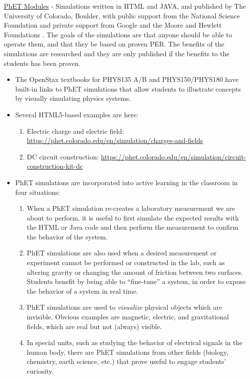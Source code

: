 \documentclass[../../../main.tex]{subfiles}
\begin{document}
\underline{PhET Modules} - Simulations written in HTML and JAVA, and published by The University of Colorado, Boulder, with public support from the National Science Foundation and private support from Google and the Moore and Hewlett Foundations \cite{phet}.  The goals of the simulations are that anyone should be able to operate them, and that they be based on proven PER.  The benefits of the simulations are researched and they are only published if the benefits to the students has been proven.
\begin{itemize}
\item The OpenStax textbooks for PHYS135 A/B and PHYS150/PHYS180 have built-in links to PhET simulations that allow students to illustrate concepts by visually simulating physics systems.
\item Several HTML5-based examples are here:
\begin{enumerate}
\item Electric charge and electric field: \url{https://phet.colorado.edu/en/simulation/charges-and-fields}
\item DC circuit construction: \url{https://phet.colorado.edu/en/simulation/circuit-construction-kit-dc}
\end{enumerate}
\item PhET simulations are incorporated into active learning in the classroom in four situations:
\begin{enumerate}
\item When a PhET simulation re-creates a laboratory measurement we are about to perform, it is useful to first simulate the expected results with the HTML or Java code and then perform the measurement to confirm the behavior of the system.
\item PhET simulations are also used when a desired measurement or experiment cannot be performed or constructed in the lab, such as altering gravity or changing the amount of friction between two surfaces.  Students benefit by being able to ``fine-tune'' a system, in order to expose the behavior of a system in real time.
\item PhET simulations are used to \textit{visualize} physical objects which are invisible.  Obvious examples are magnetic, electric, and gravitational fields, which are real but not (always) visible.
\item In special units, such as studying the behavior of electrical signals in the human body, there are PhET simulations from other fields (biology, chemistry, earth science, etc.) that prove useful to engage students' curiosity.
\end{enumerate}
\end{itemize}
\end{document}
